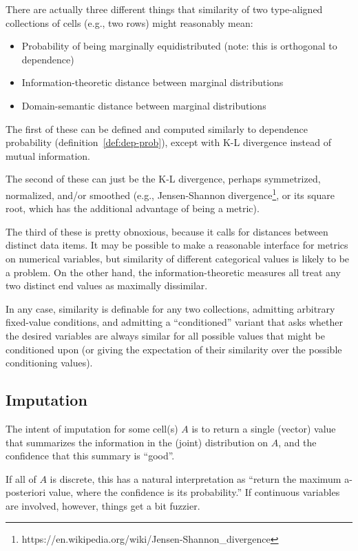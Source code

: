 \documentclass[10pt,letterpaper]{article}
\begin{document}
There are actually three different things that similarity of two
type-aligned collections of cells (e.g., two rows) might reasonably
mean:

\begin{itemize}
\item Probability of being marginally equidistributed (note: this is
  orthogonal to dependence)
\item Information-theoretic distance between marginal distributions
\item Domain-semantic distance between marginal distributions
\end{itemize}

The first of these can be defined and computed similarly to dependence
probability (definition~\ref{def:dep-prob}), except with K-L
divergence instead of mutual information.

The second of these can just be the K-L divergence, perhaps
symmetrized, normalized, and/or smoothed (e.g., Jensen-Shannon
divergence\footnote{https://en.wikipedia.org/wiki/Jensen-Shannon\_divergence},
or its square root, which has the additional advantage of being a metric).

The third of these is pretty obnoxious, because it calls for distances
between distinct data items.  It may be possible to make a reasonable
interface for metrics on numerical variables, but similarity of
different categorical values is likely to be a problem.  On the other
hand, the information-theoretic measures all treat any two distinct
end values as maximally dissimilar.

In any case, similarity is definable for any two collections,
admitting arbitrary fixed-value conditions, and admitting a
``conditioned'' variant that asks whether the desired variables are
always similar for all possible values that might be conditioned upon
(or giving the expectation of their similarity over the possible
conditioning values).

\subsection{Imputation}

The intent of imputation for some cell(s) $A$ is to return a single
(vector) value that summarizes the information in the (joint)
distribution on $A$, and the confidence that this summary is ``good''.

If all of $A$ is discrete, this has a natural interpretation as
``return the maximum a-posteriori value, where the confidence is its
probability.''  If continuous variables are involved, however, things
get a bit fuzzier.
\end{document}
